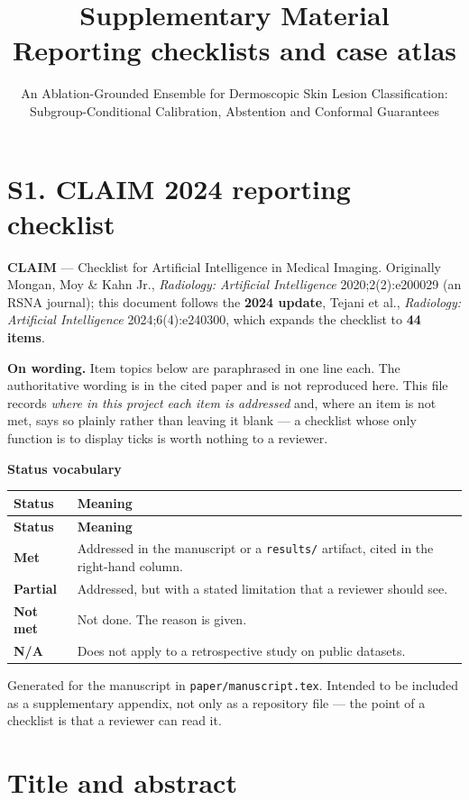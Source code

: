 \documentclass[10pt,a4paper]{article}
\title{Supplementary Material\\[0.3em]
\large Reporting checklists and case atlas}
\author{An Ablation-Grounded Ensemble for Dermoscopic Skin Lesion Classification:\\
Subgroup-Conditional Calibration, Abstention and Conformal Guarantees}
\date{}
\begin{document}
\maketitle

\section*{S1. CLAIM 2024 reporting checklist}


\textbf{CLAIM} --- Checklist for Artificial Intelligence in Medical Imaging. Originally Mongan, Moy \& Kahn Jr., \emph{Radiology: Artificial Intelligence} 2020;2(2):e200029 (an RSNA journal); this document follows the \textbf{2024 update}, Tejani et al., \emph{Radiology: Artificial Intelligence} 2024;6(4):e240300, which expands the checklist to \textbf{44 items}.


\textbf{On wording.} Item topics below are paraphrased in one line each. The authoritative wording is in the cited paper and is not reproduced here. This file records \emph{where in this project each item is addressed} and, where an item is not met, says so plainly rather than leaving it blank --- a checklist whose only function is to display ticks is worth nothing to a reviewer.


\textbf{Status vocabulary}


\begin{longtable}{@{}lp{}@{}}
\toprule
\textbf{Status} & \textbf{Meaning} \\
\midrule
\endfirsthead
\toprule
\textbf{Status} & \textbf{Meaning} \\
\midrule
\endhead
\bottomrule
\endfoot
\textbf{Met} & Addressed in the manuscript or a \texttt{results/} artifact, cited in the right-hand column. \\
\textbf{Partial} & Addressed, but with a stated limitation that a reviewer should see. \\
\textbf{Not met} & Not done. The reason is given. \\
\textbf{N/A} & Does not apply to a retrospective study on public datasets. \\
\end{longtable}


Generated for the manuscript in \texttt{paper/manuscript.tex}. Intended to be included as a supplementary appendix, not only as a repository file --- the point of a checklist is that a reviewer can read it.



\section*{Title and abstract}
\end{document}
